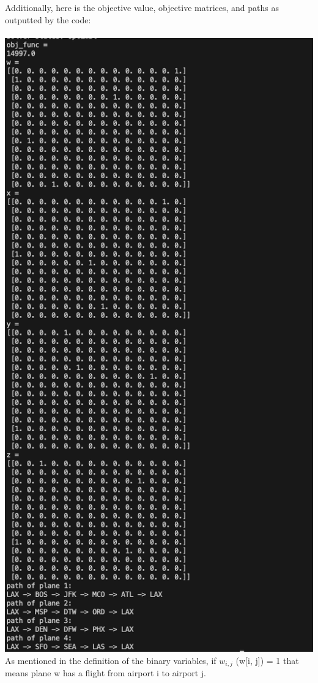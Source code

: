 \documentclass[12pt]{extarticle}
\begin{document}
Additionally, here is the objective value, objective matrices, and paths as outputted by the code: \\ \\
\includegraphics[scale = 0.5]{images/output.png} \\
As mentioned in the definition of the binary variables, if $w_{i,j}$ (w[i, j]) = 1 that means plane w has a flight from airport i to airport j. \\
\end{document}
